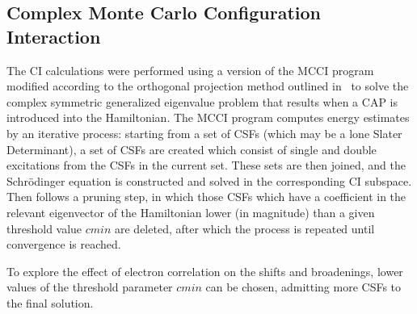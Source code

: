 % 
% 
% 


\subsection{Complex Monte Carlo Configuration Interaction}

The \ac{CI} calculations were performed using a version of the \ac{MCCI}
program~\cite{mcci1998, mcci2000} modified according to the orthogonal
projection method outlined in~\cite{tarantelli_csd} to solve the complex
symmetric generalized eigenvalue problem that results when a \ac{CAP} is
introduced into the Hamiltonian. The \ac{MCCI} program computes energy
estimates by an iterative process: starting from a set of \acp{CSF} (which may
be a lone Slater Determinant), a set of \acp{CSF} are created which consist of
single and double excitations from the \acp{CSF} in the current set. These sets
are then joined, and the Schr\"odinger equation is constructed and solved in
the corresponding \ac{CI} subspace. Then follows a pruning step, in which those
\acp{CSF} which have a coefficient in the relevant eigenvector of the
Hamiltonian lower (in magnitude) than a given threshold value $cmin$ are
deleted, after which the process is repeated until convergence is reached.

To explore the effect of electron correlation on the shifts and broadenings,
lower values of the threshold parameter $cmin$ can be chosen, admitting more
\acp{CSF} to the final solution.

